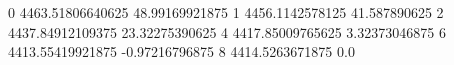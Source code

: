 0 4463.51806640625 48.99169921875
1 4456.1142578125 41.587890625
2 4437.84912109375 23.32275390625
4 4417.85009765625 3.32373046875
6 4413.55419921875 -0.97216796875
8 4414.5263671875 0.0
